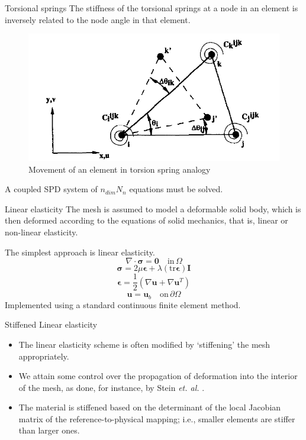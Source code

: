 \documentclass[t,12pt]{beamer}
\let\bld\boldsymbol
\begin{document}
\begin{frame}{Torsional springs}
The stiffness of the torsional springs at a node in an element is inversely related to the node angle in that element.
 \begin{figure}
 	\centering
 	\includegraphics[scale=0.25]{torsionspring}
 	\caption{Movement of an element in torsion spring analogy}
 	\label{fig:torsion}
 \end{figure}
 A coupled SPD system of $n_{dim} N_n$ equations must be solved.
\end{frame}

\begin{frame}{Linear elasticity}
  The mesh is assumed to model a deformable solid body, which is then deformed according to the equations of solid mechanics, that is, linear or non-linear elasticity.
  
  The simplest approach is linear elasticity.
  \begin{equation}
  \nabla \cdot \bld{\sigma}  = \mathbf{0} \quad \text{in} \, \Omega
  \end{equation}
  \begin{equation}
  \bld{\sigma} = 2\mu\bld{\epsilon} + \lambda (\mathrm{tr}\boldsymbol{\epsilon}) \bld{I}
  \label{linelast:constt}
  \end{equation}
  \begin{equation}
  \bld{\epsilon} = \frac12 (\nabla\bld{u}+\nabla\bld{u}^T)
  \label{linelast:strain}
  \end{equation}
  \begin{equation}
  \bld{u} = \bld{u}_b \quad \text{on} \, \partial\Omega
  \end{equation}
  Implemented using a standard continuous finite element method.
\end{frame}

\begin{frame}{Stiffened Linear elasticity}
	\begin{itemize}
	\item The linear elasticity scheme is often modified by `stiffening' the mesh appropriately. 
	\item We attain some control over the propagation of deformation into the interior of the mesh, as done, for instance, by Stein \emph{et. al.} .
	\item The material is stiffened based on the determinant of the local Jacobian matrix of the reference-to-physical mapping; i.e., smaller elements are stiffer than larger ones.
	\end{itemize}
\end{frame}
\end{document}
